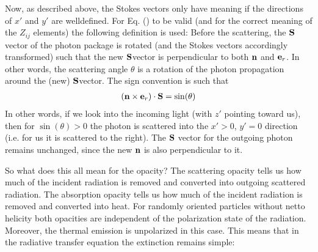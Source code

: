 \documentclass[letterpaper,10pt,english]{sphinxmanual}
\begin{document}
Now, as described above, the Stokes vectors only have meaning if the directions
of \(x'\) and \(y'\) are well\sphinxhyphen{}defined. For
Eq. () to be valid (and for the correct
meaning of the \(Z_{ij}\) elements) the following definition is used: Before
the scattering, the \({\bf S}\)\sphinxhyphen{}vector of the photon package is rotated (and
the Stokes vectors accordingly transformed) such that the new \({\bf
S}\)\sphinxhyphen{}vector is perpendicular to both \({\bf n}\) and \({\bf e}_r\). In
other words, the scattering angle \(\theta\) is a rotation of the photon
propagation around the (new) \({\bf S}\)\sphinxhyphen{}vector. The sign convention is such
that
\begin{equation*}
\begin{split}({\bf n}\times {\bf e}_r)\cdot{\bf S}=\sin(\theta)\end{split}
\end{equation*}
In other words, if we look into the incoming light (with \(z'\) pointing
toward us), then for \(\sin(\theta)>0\) the photon is scattered into the
\(x'>0\), \(y'=0\) direction (i.e. for us it is scattered to the
right).  The \({\bf S}\) vector for the outgoing photon remains unchanged,
since the new \({\bf n}\) is also perpendicular to it.

So what does this all mean for the opacity? The scattering opacity tells us
how much of the incident radiation is removed and converted into outgoing
scattered radiation. The absorption opacity tells us how much of the
incident radiation is removed and converted into heat. For randomly oriented
particles without netto helicity both opacities are independent of the
polarization state of the radiation. Moreover, the thermal emission
is unpolarized in this case. This means that in the radiative
transfer equation the extinction remains simple:
\end{document}
